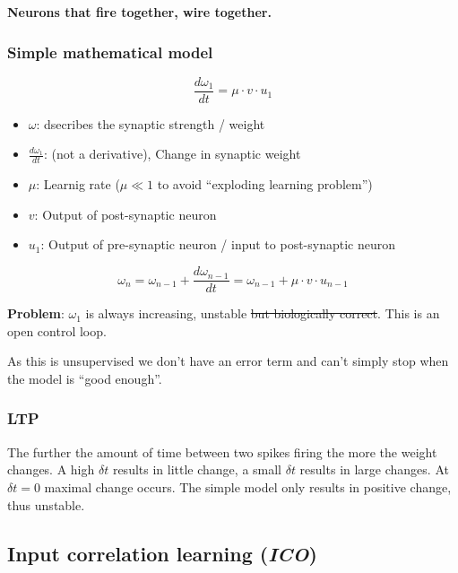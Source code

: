 \documentclass[
    fontsize      = 11pt,
    paper         = a4,
    twoside       = false,
    parskip       = half,
    pagesize      = false,
]{scrartcl}
\providecommand{\tightlist}{%
  \setlength{\itemsep}{0pt}\setlength{\parskip}{0pt}}
\begin{document}
\textbf{Neurons that fire together, wire together.}

\hypertarget{simple-mathematical-model}{%
\subsubsection{Simple mathematical
model}\label{simple-mathematical-model}}

\[\frac{\mathit{d}\omega_1}{\mathit{d}t} = \mu \cdot v \cdot u_1\]

\begin{itemize}
\tightlist
\item
  \(\omega\): dsecribes the synaptic strength / weight
\item
  \(\frac{\mathit{d}\omega_1}{\mathit{d}t}\): (not a derivative), Change
  in synaptic weight
\item
  \(\mu\): Learnig rate (\(\mu \ll 1\) to avoid ``exploding learning
  problem'')
\item
  \(v\): Output of post-synaptic neuron
\item
  \(u_1\): Output of pre-synaptic neuron / input to post-synaptic neuron
\end{itemize}

\[\omega_n = \omega_{n-1} + \frac{\mathit{d}\omega_{n-1}}{\mathit{d}t} = \omega_{n-1} + \mu \cdot v \cdot u_{n-1} \]

\textbf{Problem}: \(\omega_1\) is always increasing, unstable \sout{but
biologically correct}. This is an open control loop.

As this is unsupervised we don't have an error term and can't simply
stop when the model is ``good enough''.

\hypertarget{ltp}{%
\subsubsection{LTP}\label{ltp}}

The further the amount of time between two spikes firing the more the
weight changes. A high \(\delta t\) results in little change, a small
\(\delta t\) results in large changes. At \(\delta t = 0\) maximal
change occurs. The simple model only results in positive change, thus
unstable.

\hypertarget{input-correlation-learning-ico}{%
\subsection{\texorpdfstring{Input correlation learning
(\emph{ICO})}{Input correlation learning (ICO)}}\label{input-correlation-learning-ico}}
\end{document}
